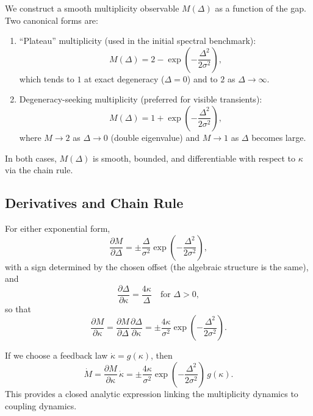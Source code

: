 \documentclass[11pt]{article}
\begin{document}
We construct a smooth multiplicity observable $M(\Delta)$ as a function of the gap. Two canonical forms are:

\begin{enumerate}[label=(\roman*)]
  \item ``Plateau'' multiplicity (used in the initial spectral benchmark):
  \begin{equation}
    M(\Delta) = 2 - \exp\left(-\frac{\Delta^2}{2\sigma^2}\right),
  \end{equation}
  which tends to $1$ at exact degeneracy ($\Delta=0$) and to $2$ as $\Delta\to\infty$.
  \item Degeneracy-seeking multiplicity (preferred for visible transients):
  \begin{equation}
    M(\Delta) = 1 + \exp\left(-\frac{\Delta^2}{2\sigma^2}\right),
  \end{equation}
  where $M\to 2$ as $\Delta\to 0$ (double eigenvalue) and $M\to 1$ as $\Delta$ becomes large.
\end{enumerate}

In both cases, $M(\Delta)$ is smooth, bounded, and differentiable with respect to $\kappa$ via the chain rule.

\subsection{Derivatives and Chain Rule}

For either exponential form,
\begin{equation}
  \frac{\partial M}{\partial \Delta}
  = \pm \frac{\Delta}{\sigma^2}
     \exp\left(-\frac{\Delta^2}{2\sigma^2}\right),
\end{equation}
with a sign determined by the chosen offset (the algebraic structure is the same), and
\begin{equation}
  \frac{\partial \Delta}{\partial \kappa}
  = \frac{4\kappa}{\Delta}
  \quad \text{for } \Delta > 0,
\end{equation}
so that
\begin{equation}
  \frac{\partial M}{\partial \kappa}
  = \frac{\partial M}{\partial \Delta}
    \frac{\partial \Delta}{\partial \kappa}
  = \pm \frac{4\kappa}{\sigma^2}
      \exp\left(-\frac{\Delta^2}{2\sigma^2}\right).
\end{equation}

If we choose a feedback law $\dot\kappa = g(\kappa)$, then
\begin{equation}
  \dot M
  = \frac{\partial M}{\partial \kappa}\,\dot\kappa
  = \pm \frac{4\kappa}{\sigma^2}
      \exp\left(-\frac{\Delta^2}{2\sigma^2}\right)\,g(\kappa).
\end{equation}
This provides a closed analytic expression linking the multiplicity dynamics to coupling dynamics.
\end{document}
